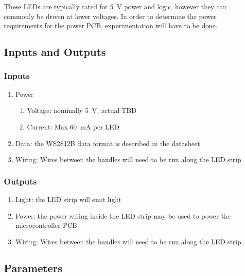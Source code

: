 \documentclass{notes}
\begin{document}
These LEDs are typically rated for \SI{5}{\volt} power and logic, however they can commonly be driven at lower voltages.
In order to determine the power requirements for the power PCB, experimentation will have to be done.

\subsection{Inputs and Outputs}

\subsubsection{Inputs}

\begin{enumerate}
    \item Power
    \begin{enumerate}
        \item Voltage: nominally \SI{5}{\volt}, actual TBD
        \item Current: Max \SI{60}{\milli\ampere} per LED
    \end{enumerate}
    \item Data: the WS2812B data format is described in the datasheet\footnotemark
    \item Wiring: Wires between the handles will need to be run along the LED strip
\end{enumerate}

\subsubsection{Outputs}

\begin{enumerate}
    \item Light: the LED strip will emit light
    \item Power: the power wiring inside the LED strip may be used to power the microcontroller PCB
    \item Wiring: Wires between the handles will need to be run along the LED strip
\end{enumerate}

\subsection{Parameters}
\end{document}
